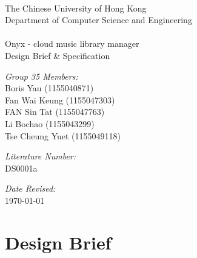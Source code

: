 \documentclass[12pt, a4paper, oneside]{article}
\begin{document}
\setcounter{page}{0}
\thispagestyle{empty}

\begin{center} \*\\
    \vspace{40mm}
    {\Large The Chinese University of Hong Kong\\Department of Computer Science and Engineering} \\ %
    \vspace{20mm}
    \hfill \\
    {\Huge Onyx - cloud music library manager} \\ %
    \vspace{8mm}
    {\Large Design Brief \& Specification} \\ %
    \vspace{20mm} 
\end{center}

\begin{minipage}{0.5\textwidth} %
    \begin{flushleft} \large

        \emph{Group 35 Members:}\\
        Boris Yau (1155040871)\\
        Fan Wai Keung (1155047303)\\
        FAN Sin Tat (1155047763)\\
        Li Bochao (1155043299)\\
        Tse Cheung Yuet (1155049118)
        \vspace{8mm}

    \end{flushleft}
\end{minipage}
\begin{minipage}{0.4\textwidth} %
    \begin{flushright} \large

        \emph{Literature Number:} \\
        DS0001a \vspace{8mm}

        \emph{Date Revised:} \\
        \today \vspace{8mm}

    \end{flushright}
\end{minipage}

\newpage
\tableofcontents %

\newpage
\section{Design Brief}
\end{document}
